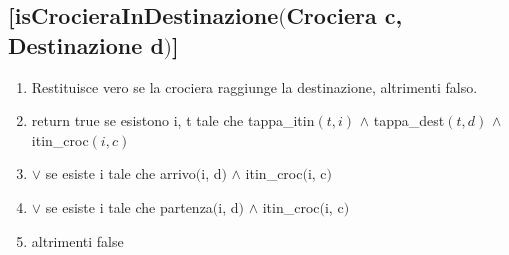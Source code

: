 \documentclass{article}
\begin{document}
\subsection*{[isCrocieraInDestinazione$($Crociera c, Destinazione d$)$]}
\begin{enumerate}
    \item Restituisce vero se la crociera raggiunge la destinazione, altrimenti falso.
    \item return true se esistono i, t tale che tappa\_itin$(t, i)$ $\land$ tappa\_dest$(t, d)$ $\land$ itin\_croc$(i, c)$
    \item $\lor$ se esiste i tale che arrivo$($i, d$)$ $\land$ itin\_croc$($i, c$)$
    \item $\lor$ se esiste i tale che partenza$($i, d$)$ $\land$ itin\_croc$($i, c$)$
    \item altrimenti false
\end{enumerate}
\end{document}
